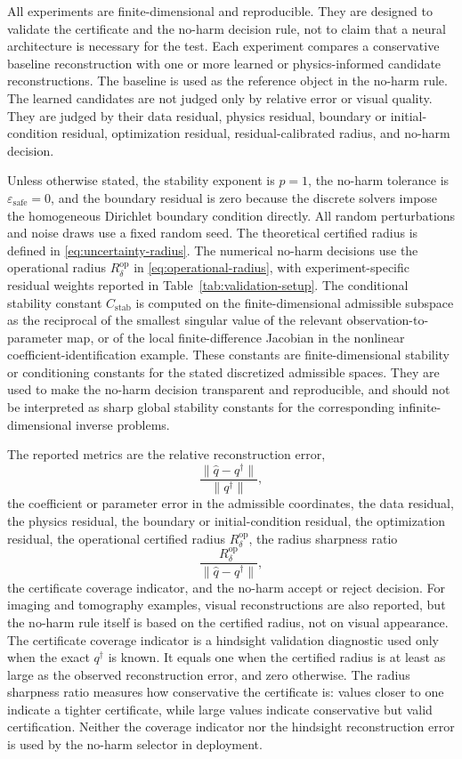 \documentclass{article}
\numberwithin{equation}{section}
\theoremstyle{definition}
\begin{document}
All experiments are finite-dimensional and reproducible. They are designed to validate the certificate and the no-harm decision rule, not to claim that a neural architecture is necessary for the test. Each experiment compares a conservative baseline reconstruction with one or more learned or physics-informed candidate reconstructions. The baseline is used as the reference object in the no-harm rule. The learned candidates are not judged only by relative error or visual quality. They are judged by their data residual, physics residual, boundary or initial-condition residual, optimization residual, residual-calibrated radius, and no-harm decision.

Unless otherwise stated, the stability exponent is \(p=1\), the no-harm tolerance is \(\varepsilon_{\mathrm{safe}}=0\), and the boundary residual is zero because the discrete solvers impose the homogeneous Dirichlet boundary condition directly. All random perturbations and noise draws use a fixed random seed. The theoretical certified radius is defined in \eqref{eq:uncertainty-radius}. The numerical no-harm decisions use the operational radius \(R_{\delta}^{\mathrm{op}}\) in \eqref{eq:operational-radius}, with experiment-specific residual weights reported in Table~\ref{tab:validation-setup}. The conditional stability constant \(C_{\mathrm{stab}}\) is computed on the finite-dimensional admissible subspace as the reciprocal of the smallest singular value of the relevant observation-to-parameter map, or of the local finite-difference Jacobian in the nonlinear coefficient-identification example. These constants are finite-dimensional stability or conditioning constants for the stated discretized admissible spaces. They are used to make the no-harm decision transparent and reproducible, and should not be interpreted as sharp global stability constants for the corresponding infinite-dimensional inverse problems.

The reported metrics are the relative reconstruction error,
\[
\frac{\|\widehat q-q^\dagger\|}{\|q^\dagger\|},
\]
the coefficient or parameter error in the admissible coordinates, the data residual, the physics residual, the boundary or initial-condition residual, the optimization residual, the operational certified radius \(R_{\delta}^{\mathrm{op}}\), the radius sharpness ratio
\[
\frac{R_{\delta}^{\mathrm{op}}}{\|\widehat q-q^\dagger\|},
\]
the certificate coverage indicator, and the no-harm accept or reject decision. For imaging and tomography examples, visual reconstructions are also reported, but the no-harm rule itself is based on the certified radius, not on visual appearance. The certificate coverage indicator is a hindsight validation diagnostic used only when the exact \(q^\dagger\) is known. It equals one when the certified radius is at least as large as the observed reconstruction error, and zero otherwise. The radius sharpness ratio measures how conservative the certificate is: values closer to one indicate a tighter certificate, while large values indicate conservative but valid certification. Neither the coverage indicator nor the hindsight reconstruction error is used by the no-harm selector in deployment.
\end{document}
